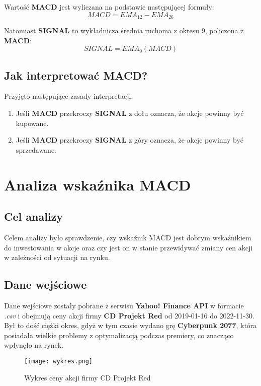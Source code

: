 \documentclass{article}
\begin{document}
    Wartość \textbf{MACD} jest wyliczana na podstawie następującej formuły:
    \begin{equation}
        MACD = EMA_{12} - EMA_{26}
    \end{equation}

    Natomiast \textbf{SIGNAL} to wykładnicza średnia ruchoma z okresu 9, policzona z \textbf{MACD}:
    \begin{equation}
        SIGNAL = EMA_{9}(MACD)
    \end{equation}

    \subsection{Jak interpretować MACD?}
    Przyjęto następujące zasady interpretacji:
    \begin{enumerate}
        \item Jeśli \textbf{MACD} przekroczy \textbf{SIGNAL} z dołu oznacza, że akcje powinny być kupowane.
        \item Jeśli \textbf{MACD} przekroczy \textbf{SIGNAL} z góry oznacza, że akcje powinny być sprzedawane.
    \end{enumerate}

    \section{Analiza wskaźnika MACD}
    \subsection{Cel analizy}
    Celem analizy było sprawdzenie, czy wskaźnik MACD jest dobrym wskaźnikiem do inwestowania w akcje
    oraz czy jest on w stanie przewidywać zmiany cen akcji w zależności od sytuacji na rynku.
    \subsection{Dane wejściowe}
    Dane wejściowe zostały pobrane z serwisu \textbf{Yahoo! Finance API} w formacie \textit{.csv} i obejmują
    ceny akcji firmy \textbf{CD Projekt Red} od 2019-01-16 do 2022-11-30.
    Był to dość ciężki okres, gdyż w tym czasie wydano grę
    \textbf{Cyberpunk 2077}, która posiadała wielkie problemy z optymalizacją podczas premiery,
    co znacząco wpłynęło na rynek.

    \begin{figure}[H]
        \texttt{[image: wykres.png]}
        \centering
        \caption{Wykres ceny akcji firmy CD Projekt Red}
    \end{figure}
\end{document}
